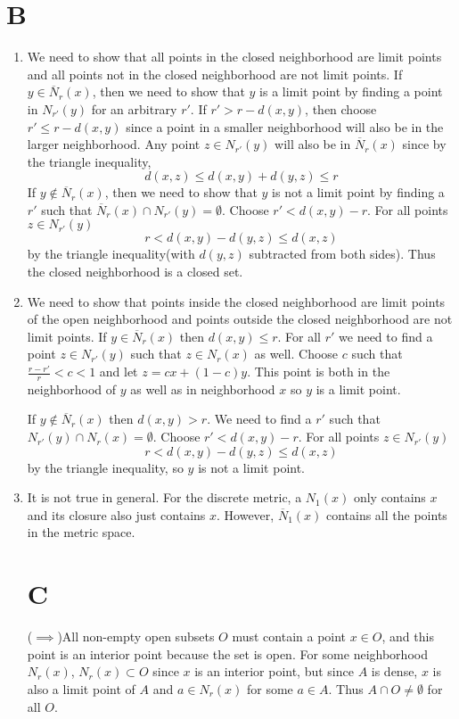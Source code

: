 \documentclass{article}
\begin{document}
\section*{B}
\begin{enumerate}
    \item We need to show that all points in the closed neighborhood
    are limit points and all points not in the closed neighborhood 
    are not limit points.
    If $y \in \overline{N}_r(x)$, then we need to show that $y$ is a limit point by
    finding a point in $N_{r'}(y)$ for an arbitrary $r'$.
    If $r' > r - d(x,y)$, then choose $r' \leq r - d(x,y)$ since a point in 
    a smaller neighborhood will also be in the larger neighborhood.
    Any point $z \in N_{r'}(y)$ will also be in $\overline{N}_r(x)$ since 
    by the triangle inequality, 
    \[
        d(x, z) \leq d(x,y) + d(y,z) \leq r
    \]
    If $y \not\in \overline{N}_r(x)$,  then we need to show that $y$ is not a limit point
    by finding a $r'$ such that $\overline{N}_r(x) \cap N_{r'}(y) = \emptyset$.
    Choose $r' < d(x,y) - r$. 
    For all points $z \in N_{r'}(y)$
    \[
        r < d(x,y) - d(y,z) \leq d(x,z)
    \]
    by the triangle inequality(with $d(y,z)$ subtracted from both sides).
    Thus the closed neighborhood is a closed set.
    \item We need to show that points inside the closed neighborhood are limit points 
    of the open neighborhood
    and points outside the closed neighborhood are not limit points.
    If $y \in \overline{N}_r(x)$ then $d(x,y) \leq r$.
    For all $r'$ we need to find a point $z\in N_{r'}(y)$
    such that $z \in N_r(x)$ as well.
    Choose $c$ such that $ \frac{r - r'}{r} < c < 1$ 
    and let $z = cx + (1-c)y$.
    This point is both in the neighborhood of $y$ as well as in 
    neighborhood $x$ so $y$ is a limit point.

    If $y \not\in \overline{N}_r(x)$ then $d(x,y) > r$.
    We need to find a $r'$ such that $N_{r'}(y) \cap N_r(x) = \emptyset$.
    Choose $r' < d(x,y) - r$.
    For all points $z \in N_{r'}(y)$
    \[
        r < d(x,y) - d(y,z) \leq d(x,z)
    \]
    by the triangle inequality, so $y$ is not a limit point.
    \item It is not true in general.
    For the discrete metric, a $N_1(x)$ only contains $x$ and its closure
    also just contains $x$. 
    However, $\overline{N}_1(x)$ contains all the points in the metric space.
\newpage
\section*{C}
    ($\implies$)All non-empty open subsets $O$
    must contain a point $x \in O$,
    and this point is an interior point because the set is open.
    For some neighborhood $N_r(x)$, $N_r(x) \subset O$
    since $x$ is an interior point, but since $A$ is dense,
    $x$ is also a limit point of $A$ and $a \in N_r(x)$
    for some $a \in A$.
    Thus $A \cap O \neq \emptyset$ for all $O$.


\end{enumerate}
\end{document}
